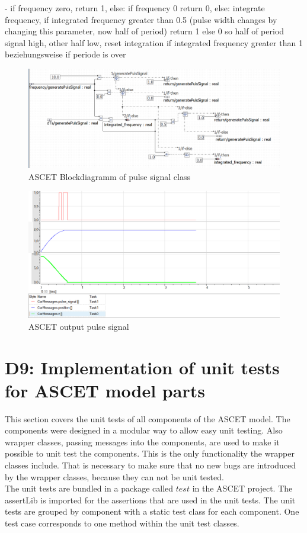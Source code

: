 - if frequency zero, return 1, else: if frequency 0 return 0, else: integrate frequency, if integrated frequency greater than 0.5 (pulse width changes by changing this parameter, now half of period) return 1 else 0 so half of period signal high, other half low, reset integration if integrated frequency greater than 1 beziehungsweise if periode is over\\

\begin{figure}[H]
\centering
\includegraphics[width=1\textwidth]{images/Blockdiagramm_PulseSignalClass.png}
\caption{ASCET Blockdiagramm of pulse signal class}
\label{fig:BlockdiagrammPulseSignal}
\end{figure}


\begin{figure}[H]
\centering
\includegraphics[width=1 \textwidth]{images/ASCET_pulseSignal.png}
\caption{ASCET output pulse signal}
\label{fig:BlockdiagrammPulseSignalOutput}
\end{figure}

\chapter{D9: Implementation of unit tests for ASCET model parts}\label{cha:D9}
This section covers the unit tests of all components of the ASCET model.
The components were designed in a modular way to allow easy unit testing.
Also wrapper classes, passing messages into the components, are used to make it possible to unit test the components.
This is the only functionality the wrapper classes include.
That is necessary to make sure that no new bugs are introduced by the wrapper classes, because they can not be unit tested.\\
The unit tests are bundled in a package called $test$ in the ASCET project. The assertLib is imported for the assertions that are used in the unit tests. The unit tests are grouped by component with a static test class for each component. One test case corresponds to one method within the unit test classes.\\

